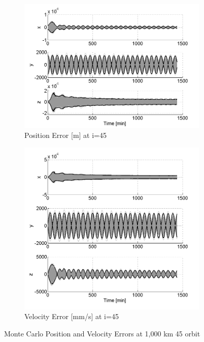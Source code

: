 \documentclass[]{aiaa-tc}%
\begin{document}
%
\begin{figure}[h!]
\centering
\begin{subfigure}{.49\textwidth}
  \centering
  \includegraphics{MC_pos45}
  \caption{Position Error [m] at i=45\degree}
  \label{fig:mcpos45}
\end{subfigure}%
\begin{subfigure}{.49\textwidth} 
  \centering
  \includegraphics{MC_vel45}
  \caption{Velocity Error [mm/s] at i=45\degree}
  \label{fig:coastline}
\end{subfigure}
\caption{Monte Carlo Position and Velocity Errors at 1,000 km 45 \degree orbit}
\label{fig:mcvel45}
\end{figure}
\end{document}
